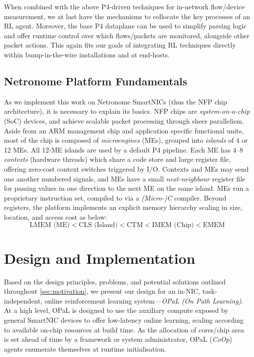 \documentclass[
sigconf,natbib=false
]{acmart}
\newcommand{\approach}{On Path Learning}
\newcommand{\approachshort}{OPaL}
\newcommand{\Coopfw}{\emph{CoOp}}
\newcounter{insightc}
\newenvironment{insight}
	{
		\begin{tipblock}\refstepcounter{insightc}\textbf{Insight \theinsightc:}\em
	}
	{
		\end{tipblock}
	}
\begin{document}
When combined with the above P4-driven techniques for in-network flow/device measurement, we at last have the mechanisms to collocate the key processes of an RL agent.
Moreover, the base P4 dataplane can be used to simplify parsing logic and offer runtime control over which flows/packets are monitored, alongside other packet actions.
This again fits our goals of integrating RL techniques directly within bump-in-the-wire installations and at end-hosts.


\subsection{Netronome Platform Fundamentals}
As we implement this work on Netronome SmartNICs (thus the NFP chip architecture), it is necessary to explain its basics.
NFP chips are \emph{system-on-a-chip} (SoC) devices, and achieve scalable packet processing through sheer parallelism.
Aside from an ARM management chip and application specific functional units, most of the chip is composed of \emph{microengines} (MEs), grouped into \emph{islands} of 4 or 12 MEs.
All 12-ME islands are used by a default P4 pipeline.
Each ME has \numrange{4}{8} \emph{contexts} (hardware threads) which share a code store and large register file, offering zero-cost context switches triggered by I/O.
Contexts and MEs may send one another numbered signals, and MEs have a small \emph{next-neighbour} register file for passing values in one direction to the next ME on the same island.
MEs run a proprietary instruction set, compiled to via a \emph{(Micro-)C} compiler.
Beyond registers, the platform implements an explicit memory hierarchy scaling in size, location, and access cost as below:
$$\text{LMEM (ME)} < \text{CLS (Island)} < \text{CTM} < \text{IMEM (Chip)} < \text{EMEM}$$

\section{Design and Implementation}\label{sec:design}
Based on the design principles, problems, and potential solutions outlined throughout \cref{sec:motivation}, we present our design for an in-NIC, task-independent, online reinforcement learning system---\emph{\approachshort{} (\approach)}.
At a high level, \approachshort{} is designed to use the auxiliary compute exposed by general SmartNIC devices to offer low-latency online learning, scaling according to available on-chip resources at build time.
As the allocation of cores/chip area is set ahead of time by a framework or system administrator, \approachshort{} (\Coopfw) agents enumerate themselves at runtime initialisation.
\end{document}
